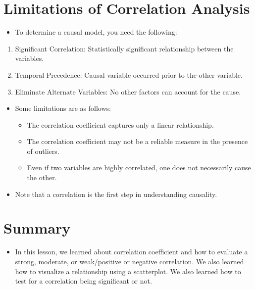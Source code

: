 \documentclass[
  letterpaper,
  DIV=11,
  numbers=noendperiod]{scrreprt}
\providecommand{\tightlist}{%
  \setlength{\itemsep}{0pt}\setlength{\parskip}{0pt}}\usepackage{longtable,booktabs,array}
\begin{document}

\chapter{Limitations of Correlation
Analysis}\label{limitations-of-correlation-analysis}

\begin{itemize}
\tightlist
\item
  To determine a causal model, you need the following:
\end{itemize}

\begin{enumerate}
\def\labelenumi{\arabic{enumi}.}
\tightlist
\item
  Significant Correlation: Statistically significant relationship
  between the variables.
\item
  Temporal Precedence: Causal variable occurred prior to the other
  variable.
\item
  Eliminate Alternate Variables: No other factors can account for the
  cause.
\end{enumerate}

\begin{itemize}
\tightlist
\item
  Some limitations are as follows:

  \begin{itemize}
  \tightlist
  \item
    The correlation coefficient captures only a linear relationship.
  \item
    The correlation coefficient may not be a reliable measure in the
    presence of outliers.
  \item
    Even if two variables are highly correlated, one does not
    necessarily cause the other.
  \end{itemize}
\item
  Note that a correlation is the first step in understanding causality.
\end{itemize}


\chapter{Summary}\label{summary-9}

\begin{itemize}
\tightlist
\item
  In this lesson, we learned about correlation coefficient and how to
  evaluate a strong, moderate, or weak/positive or negative correlation.
  We also learned how to visualize a relationship using a scatterplot.
  We also learned how to test for a correlation being significant or
  not.
\end{itemize}
\end{document}
